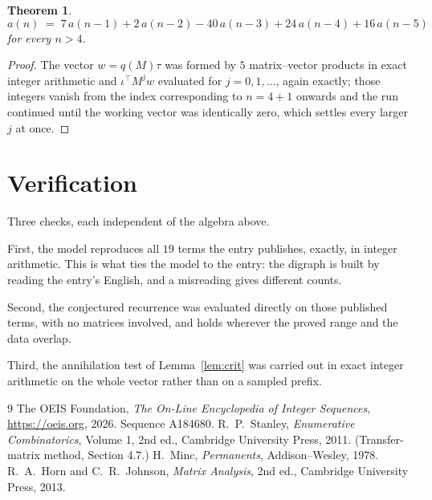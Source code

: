 \documentclass[11pt,a4paper]{article}
\theoremstyle{plain}
\newtheorem{theorem}{Theorem}
\theoremstyle{definition}
\begin{document}
\begin{theorem}
\[
a(n)\;=\;7\,a(n-1) + 2\,a(n-2) - 40\,a(n-3) + 24\,a(n-4) + 16\,a(n-5)
\]
for every $n>4$.
\end{theorem}

\begin{proof}
The vector $w=q(M)\tau$ was formed by $5$ matrix--vector products in exact integer
arithmetic and $\iota^{\!\top}M^{j}w$ evaluated for $j=0,1,\dots$, again exactly; those
integers vanish from the index corresponding to $n=4+1$ onwards and the run continued
until the working vector was identically zero, which settles every larger $j$ at once.
\end{proof}

\section{Verification}

Three checks, each independent of the algebra above.

First, the model reproduces all $19$ terms the entry publishes, exactly, in integer
arithmetic. This is what ties the model to the entry: the digraph is built by reading the
entry's English, and a misreading gives different counts.

Second, the conjectured recurrence was evaluated directly on those published terms, with no
matrices involved, and holds wherever the proved range and the data overlap.

Third, the annihilation test of Lemma~\ref{lem:crit} was carried out in exact integer
arithmetic on the whole vector rather than on a sampled prefix.

\begin{thebibliography}{9}
 The OEIS Foundation, \emph{The On-Line Encyclopedia of Integer
Sequences}, \url{https://oeis.org}, 2026. Sequence A184680.
 R.~P.~Stanley, \emph{Enumerative Combinatorics}, Volume 1, 2nd ed.,
Cambridge University Press, 2011. (Transfer-matrix method, Section 4.7.)
 H.~Minc, \emph{Permanents}, Addison--Wesley, 1978.
 R.~A.~Horn and C.~R.~Johnson, \emph{Matrix Analysis}, 2nd ed., Cambridge
University Press, 2013.
\end{thebibliography}
\end{document}
